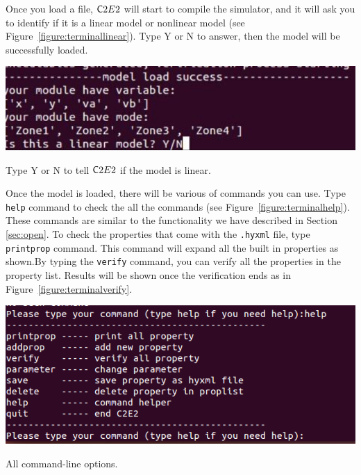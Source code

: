 \documentclass{tufte-book} %
\begin{document}

 Once you load a file, ${{\mathsf C2E2}}$ will start to compile the simulator, and it will ask you to identify if it is a linear model or nonlinear model (see Figure~\ref{figure:terminallinear}). Type Y or N to answer, then the model will be successfully loaded.
  \begin{marginfigure}
  \centerline{\includegraphics[scale=.15,keepaspectratio=true]{Manual_ver0_2_image/terminal_linear.png}}
  \caption{Type Y or N to tell ${{\mathsf C2E2}}$ if the model is linear.} 
   \label{figure:terminallinear}
 \end{marginfigure}

Once the model is loaded, there will be various of commands you can use. Type \texttt{help} command to check the all the commands (see Figure~\ref{figure:terminalhelp}). These commands are similar to the functionality we have described in Section \ref{sec:open}. To check the properties that come with the \texttt{.hyxml} file, type \texttt{printprop} command. This command will expand all the built in properties as shown.By typing the \texttt{verify} command, you can verify all the properties in the property list. Results will be shown once the verification ends as in Figure~\ref{figure:terminalverify}.
 \begin{marginfigure}
  \centerline{\includegraphics[scale=.25,keepaspectratio=true]{Manual_ver0_2_image/terminal_help.png}}
  \caption{All command-line options.} 
   \label{figure:terminalhelp}
 \end{marginfigure}

\end{document}
